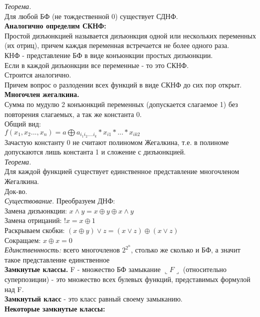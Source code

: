 \documentclass{article}
\begin{document}
\textit{Теорема.}\\
Для любой БФ (не тождественной 0) существует СДНФ.\\
\textbf{Аналогично определим СКНФ:}\\
Простой дизъюнкцией называется дизъюнкция одной или нескольких переменных (их отриц), причем каждая переменная встречается не более одного раза.\\
КНФ - представление БФ в виде конъюнкции простых дизъюнкции.\\
Если в каждой дизъюнкции все переменные - то это СКНФ.\\
Строится аналогично.\\
Причем вопрос о разлодении всех функций в виде СКНФ до сих пор открыт.\\
\textbf{Многочлен жегалкина.}\\
Сумма по мудулю 2 конъюнкций переменных (допускается слагаемое 1) без повторения слагаемых, а так же константа 0.\\
Общий вид:\\
$f(x_1, x_2..., x_n) = a \bigoplus a_{i_1i_2....i_k}* x_{i1}*...*x_{ik2}$\\
Зачастую константу 0 не считают полиномом Жегалкина, т.е. в полиноме допускаются лишь константа 1 и сложение с дизъюнкцией.\\
\textit{Теорема.}\\	
Для каждой функцией существует единственное представление многочленом Жегалкина.\\
Док-во.\\
\textit{Существование.} Преобразуем ДНФ:\\
Замена дизъюнкции: $x \wedge y = x \oplus y \oplus x \wedge y$\\
Замена отрицаний: $!x = x \oplus 1$\\
Раскрываем скобки: $(x \oplus y) \vee z = (x \vee z) \oplus (x \vee z)$\\
Сокращаем: $x \oplus x = 0$\\
\textit{Единственнность:} всего многочленов $2^{2^n}$, столько же сколько и БФ, а значит такое представление единственное\\
\textbf{Замкнутые классы.}
F - множество БФ замыкание $\llcorner F\lrcorner$ (относительно суперпозиции) - это множество всех булевых функций, представимых формулой над F.\\
\textbf{Замкнутый класс} - это класс равный своему замыканию.\\
\textbf{Некоторые замкнутые классы:}
\end{document}
